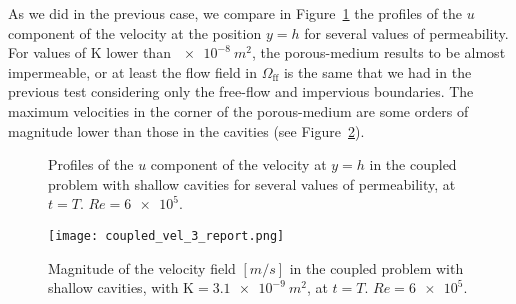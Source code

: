 As we did in the previous case, we compare in Figure~\ref{fig:md_wall_velocities} the profiles of the $u$ component of the velocity at the position $y=h$ for several values of permeability. For values of $\mathrm{K}$ lower than $\SI{e-8}{m^2}$, the porous-medium results to be almost impermeable, or at least the flow field in $\Omega_\text{ff}$ is the 
same that we had in the previous test considering only the free-flow and impervious boundaries. The maximum velocities in the 
corner of the porous-medium are some orders of magnitude lower than those in 
the cavities (see Figure~\ref{fig:coupled_vel_3}).
\begin{figure}
	\centering
	
	\caption[Profiles of the $u$ component of the velocity at $y=h$ in the coupled problem with shallow cavities]{Profiles of the $u$ component of the velocity at $y=h$ in the coupled problem with shallow cavities for several values of permeability, at $t=T$. $Re = \num{6e5}$.}
	\label{fig:md_wall_velocities}
\end{figure}
\begin{figure}
	\centering
	\texttt{[image: coupled\_vel\_3\_report.png]}
	\caption[Magnitude of the velocity field in the coupled problem with shallow cavities]{Magnitude of the velocity field $[\si{m/s}]$ in the coupled problem with shallow cavities, with $\mathrm{K}=\SI{3.1e-9}{m^2}$, at $t=T$. $Re=\num{6e5}$.}
	\label{fig:coupled_vel_3}
\end{figure}

